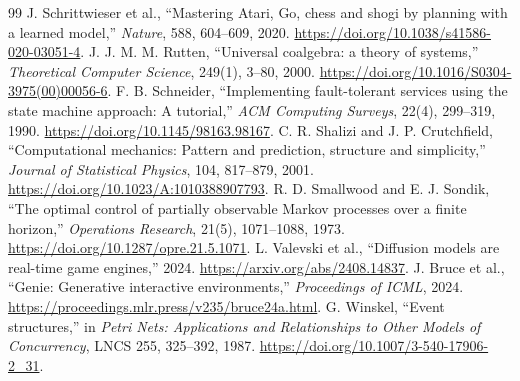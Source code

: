 \documentclass[11pt]{article}
\begin{document}
\begin{thebibliography}{99}
 J. Schrittwieser et al., ``Mastering Atari, Go, chess and shogi by planning with a learned model,'' \emph{Nature}, 588, 604--609, 2020. \url{https://doi.org/10.1038/s41586-020-03051-4}.
 J. J. M. M. Rutten, ``Universal coalgebra: a theory of systems,'' \emph{Theoretical Computer Science}, 249(1), 3--80, 2000. \url{https://doi.org/10.1016/S0304-3975(00)00056-6}.
 F. B. Schneider, ``Implementing fault-tolerant services using the state machine approach: A tutorial,'' \emph{ACM Computing Surveys}, 22(4), 299--319, 1990. \url{https://doi.org/10.1145/98163.98167}.
 C. R. Shalizi and J. P. Crutchfield, ``Computational mechanics: Pattern and prediction, structure and simplicity,'' \emph{Journal of Statistical Physics}, 104, 817--879, 2001. \url{https://doi.org/10.1023/A:1010388907793}.
 R. D. Smallwood and E. J. Sondik, ``The optimal control of partially observable Markov processes over a finite horizon,'' \emph{Operations Research}, 21(5), 1071--1088, 1973. \url{https://doi.org/10.1287/opre.21.5.1071}.
 L. Valevski et al., ``Diffusion models are real-time game engines,'' 2024. \url{https://arxiv.org/abs/2408.14837}.
 J. Bruce et al., ``Genie: Generative interactive environments,'' \emph{Proceedings of ICML}, 2024. \url{https://proceedings.mlr.press/v235/bruce24a.html}.
 G. Winskel, ``Event structures,'' in \emph{Petri Nets: Applications and Relationships to Other Models of Concurrency}, LNCS 255, 325--392, 1987. \url{https://doi.org/10.1007/3-540-17906-2_31}.
\end{thebibliography}
\end{document}
